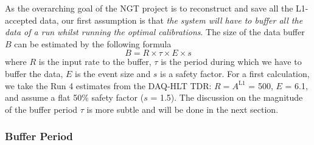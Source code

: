 As the overarching goal of the NGT project is to reconstruct and save all the L1-accepted data, 
our first assumption is that 
\emph{the system will have to buffer all the data of a run whilst running the optimal calibrations}.
The size of the data buffer $B$ can be estimated by the following formula
\begin{equation}
B = R \times \tau \times E \times s
\label{eq:buffersize}
\end{equation}
where $R$ is the input rate to the buffer,
$\tau$ is the period during which we have to buffer the data,
$E$ is the event size and
$s$ is a safety factor.
For a first calculation, we take the Run 4 estimates from the DAQ-HLT TDR:
$R = A^\text{L1}$ = 500\kHz, $E$ = 6.1\MB,
and assume a flat 50\% safety factor ($s$ = 1.5).
The discussion on the magnitude of the buffer period $\tau$ is more subtle and will be done in the next section.

\subsubsection{Buffer Period}

